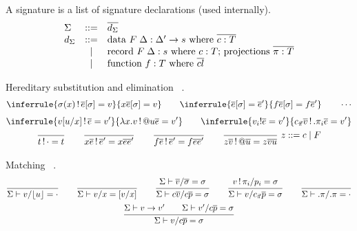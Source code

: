 \documentclass[acmlarge]{acmart}\settopmatter{}
\renewcommand{\|}{\mid}
\begin{document}
A signature is a list of signature declarations (used internally).
\[
\begin{array}{lcl}
\Sigma & ::= &  \overline{d_\Sigma} \\
d_\Sigma & ::= & \datasig \\
& \| & \recsig \\
& \| & \funsig
\end{array}
\]


Hereditary substitution 
and elimination \ .
\begin{gather*}
\inferrule
  {\sigma(x) \bang \overline{e}[\sigma] = v}
  {x \overline{e}[\sigma] = v}
\qquad
\inferrule
  {\overline{e}[\sigma] = \overline{e}'}
  {f \overline{e}[\sigma] = f \overline{e}'}
\qquad
\cdots
\end{gather*}
\begin{gather*}
\inferrule
  { v[u/x] \bang \overline{e} = v'}
  {\lambda x.v \bang @u \overline{e} = v'}
\qquad
\inferrule
  {v_i ! \overline{e} = v'}
  {\cpi \overline{v} \bang .\pi_i \overline{e} = v'}
\\
\ru{}{t \bang \cdot = t}
\qquad
\ru{}{x \overline{e} \bang \overline{e}' = x \overline{e}
  \overline{e}'}
\qquad
\ru{}{f \overline{e} \bang \overline{e}' = f \overline{e} \overline{e}'}
\qquad
\ru{}{z \overline{v} \bang @ \overline{u} = z \overline{v}
  \overline{u}}\ z ::= c \mid F
\end{gather*}



Matching \ .
\begin{gather*}
\ru{}{\Sigma \vdash v/\lfloor u \rfloor = \cdot} %
\qquad
\ru{}{\Sigma \vdash v/x = [v/x]} %
\qquad
\ru
  {\Sigma \vdash \overline{v}/\overline{\sigma} = \sigma}
  {\Sigma \vdash c\overline{v}/c\overline{p} = \sigma}  %
\qquad
\ru{v \bang \pi_i / p_i = \sigma}
{\Sigma \vdash v / \cpi \overline{p} = \sigma} %
\qquad
\ru{}{\Sigma \vdash .\pi/.\pi = \cdot} %
\\
\ru{\Sigma \vdash v \to v' \qquad \Sigma \vdash v'/c\overline{p} = \sigma}
{\Sigma \vdash v / c \overline{p} = \sigma} %
\end{gather*}
\end{document}
